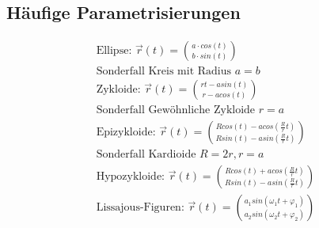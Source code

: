 \subsection{Häufige Parametrisierungen}
    \begin{align*}
        \text{Ellipse: } \overrightarrow{r}(t) = \binom{a \cdot cos(t)}{b \cdot sin(t)}\\
        \text{Sonderfall Kreis mit Radius } a = b\\
        \text{Zykloide: } \overrightarrow{r}(t) = \binom{rt - a sin(t)}{r - a cos(t)}\\
        \text{Sonderfall Gewöhnliche Zykloide } r = a\\
        \text{Epizykloide: } \overrightarrow{r}(t) = \binom{R cos(t) - a cos(\frac{R}{r} t)}{R sin(t) - a sin(\frac{R}{r} t)}\\
        \text{Sonderfall Kardioide } R = 2r, r = a\\
        \text{Hypozykloide: } \overrightarrow{r}(t) = \binom{R cos(t) + a cos(\frac{R}{r} t)}{R sin(t) - a sin(\frac{R}{r} t)}\\
        \text{Lissajous-Figuren: } \overrightarrow{r}(t) = \binom{a_1 sin(\omega_1 t + \varphi_1)}{a_2 sin(\omega_2 t + \varphi_2)}
    \end{align*}
